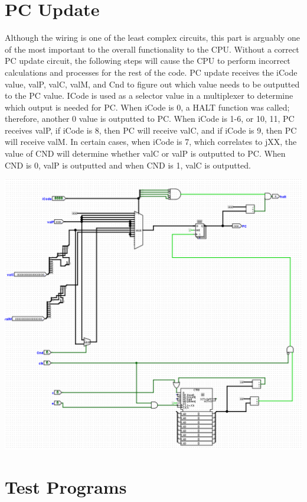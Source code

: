 \documentclass{article}
\begin{document}
\section{PC Update}
Although the wiring is one of the least complex circuits, this part is arguably one of the most important to the overall functionality to the CPU. Without a correct PC update circuit, the following steps will cause the CPU to perform incorrect calculations and processes for the rest of the code. PC update receives the iCode value, valP, valC, valM, and Cnd to figure out which value needs to be outputted to the PC value. ICode is used as a selector value in a multiplexer to determine which output is needed for PC. When iCode is 0, a HALT function was called; therefore, another 0 value is outputted to PC. When iCode is 1-6, or 10, 11, PC receives valP, if iCode is 8, then PC will receive valC, and if iCode is 9, then PC will receive valM. In certain cases, when iCode is 7, which correlates to jXX, the value of CND will determine whether valC or valP is outputted to PC. When CND is 0, valP is outputted and when CND is 1, valC is outputted. 
\begin{center}
    \includegraphics[scale=.45]{pcupdate.png}
\end{center}

\section{Test Programs}
\end{document}
